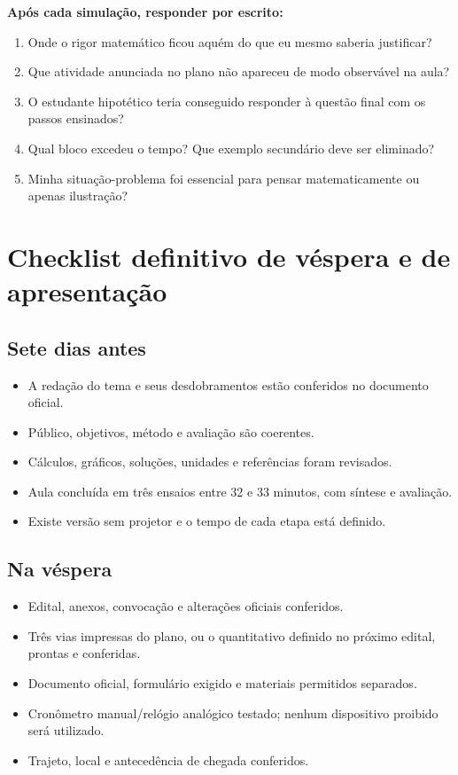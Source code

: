 \documentclass[11pt,a4paper]{article}
\begin{document}
\textbf{Após cada simulação, responder por escrito:}
\begin{enumerate}
\item Onde o rigor matemático ficou aquém do que eu mesmo saberia justificar?
\item Que atividade anunciada no plano não apareceu de modo observável na aula?
\item O estudante hipotético teria conseguido responder à questão final com os passos ensinados?
\item Qual bloco excedeu o tempo? Que exemplo secundário deve ser eliminado?
\item Minha situação-problema foi essencial para pensar matematicamente ou apenas ilustração?
\end{enumerate}

\section{Checklist definitivo de véspera e de apresentação}
\subsection*{Sete dias antes}
\begin{itemize}[label=$\square$]
\item A redação do tema e seus desdobramentos estão conferidos no documento oficial.
\item Público, objetivos, método e avaliação são coerentes.
\item Cálculos, gráficos, soluções, unidades e referências foram revisados.
\item Aula concluída em três ensaios entre 32 e 33 minutos, com síntese e avaliação.
\item Existe versão sem projetor e o tempo de cada etapa está definido.
\end{itemize}

\subsection*{Na véspera}
\begin{itemize}[label=$\square$]
\item Edital, anexos, convocação e alterações oficiais conferidos.
\item Três vias impressas do plano, ou o quantitativo definido no próximo edital, prontas e conferidas.
\item Documento oficial, formulário exigido e materiais permitidos separados.
\item Cronômetro manual/relógio analógico testado; nenhum dispositivo proibido será utilizado.
\item Trajeto, local e antecedência de chegada conferidos.
\end{itemize}
\end{document}
